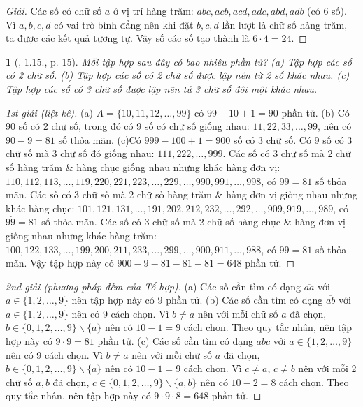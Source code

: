 \documentclass{article}
\newtheorem{baitoan}{}
\begin{document}
\begin{proof}[Giải]
	Các số có chữ số $a$ ở vị trí hàng trăm: $\overline{abc},\overline{acb},\overline{acd},\overline{adc},\overline{abd},\overline{adb}$ (có 6 số). Vì $a,b,c,d$ có vai trò bình đẳng nên khi đặt $b,c,d$ lần lượt là chữ số hàng trăm, ta được các kết quả tương tự. Vậy số các số tạo thành là $6\cdot4 = 24$.
\end{proof}

\begin{baitoan}[\cite{Binh_boi_duong_Toan_6_tap_1}, 1.15., p. 15]
	Mỗi tập hợp sau đây có bao nhiêu phần tử? (a) Tập hợp các số có 2 chữ số. (b) Tập hợp các số có 2 chữ số được lập nên từ 2 số khác nhau. (c) Tập hợp các số có 3 chữ số được lập nên tử 3 chữ số đôi một khác nhau.
\end{baitoan}

\begin{proof}[1st giải (liệt kê)]
	(a) $A = \{10,11,12,\ldots,99\}$ có $99 - 10 + 1 = 90$ phần tử. (b) Có 90 số có 2 chữ số, trong đó có 9 số có chữ số giống nhau: $11, 22,33,\ldots,99$, nên có $90 - 9 = 81$ số thỏa mãn. (c)Có $999 - 100 + 1 = 900$ số có 3 chữ số. Có 9 số có 3 chữ số mà 3 chữ số đó giống nhau: $111,222,\ldots,999$. Các số có 3 chữ số mà 2 chữ số hàng trăm \& hàng chục giống nhau nhưng khác hàng đơn vị: $110,112,113,\ldots,119,220,221,223,\ldots,229,\ldots,990,991,\ldots,998$, có $9\dot9 = 81$ số thỏa mãn. Các số có 3 chữ số mà 2 chữ số hàng trăm \& hàng đơn vị giống nhau nhưng khác hàng chục: $101,121,131,\ldots,191,202,212,232,\ldots,292,\ldots,909,919,\ldots,989$, có $9\dot9 = 81$ số thỏa mãn. Các số có 3 chữ số mà 2 chữ số hàng chục \& hàng đơn vị giống nhau nhưng khác hàng trăm: $100,122,133,\ldots,199,200,211,233,\ldots,299,\ldots,900,911,\ldots,988$, có $9\dot9 = 81$ số thỏa mãn. Vậy tập hợp này có $900 - 9 - 81 - 81 - 81 = 648$ phần tử.
\end{proof}

\begin{proof}[2nd giải (phương pháp đếm của Tổ hợp)]
	(a) Các số cần tìm có dạng $\overline{aa}$ với $a\in\{1,2,\ldots,9\}$ nên tập hợp này có 9 phần tử. (b) Các số cần tìm có dạng $\overline{ab}$ với $a\in\{1,2,\ldots,9\}$ nên có 9 cách chọn. Vì $b\ne a$ nên với mỗi chữ số $a$ đã chọn, $b\in\{0,1,2,\ldots,9\}\backslash\{a\}$ nên có $10 - 1 = 9$ cách chọn. Theo quy tắc nhân, nên tập hợp này có $9\cdot9 = 81$ phần tử. (c) Các số cần tìm có dạng $\overline{abc}$ với $a\in\{1,2,\ldots,9\}$ nên có 9 cách chọn. Vì $b\ne a$ nên với mỗi chữ số $a$ đã chọn, $b\in\{0,1,2,\ldots,9\}\backslash\{a\}$ nên có $10 - 1 = 9$ cách chọn. Vì $c\ne a$, $c\ne b$ nên với mỗi 2 chữ số $a,b$ đã chọn, $c\in\{0,1,2,\ldots,9\}\backslash\{a,b\}$ nên có $10 - 2 = 8$ cách chọn. Theo quy tắc nhân, nên tập hợp này có $9\cdot9\cdot8 = 648$ phần tử.
\end{proof}
\end{document}
